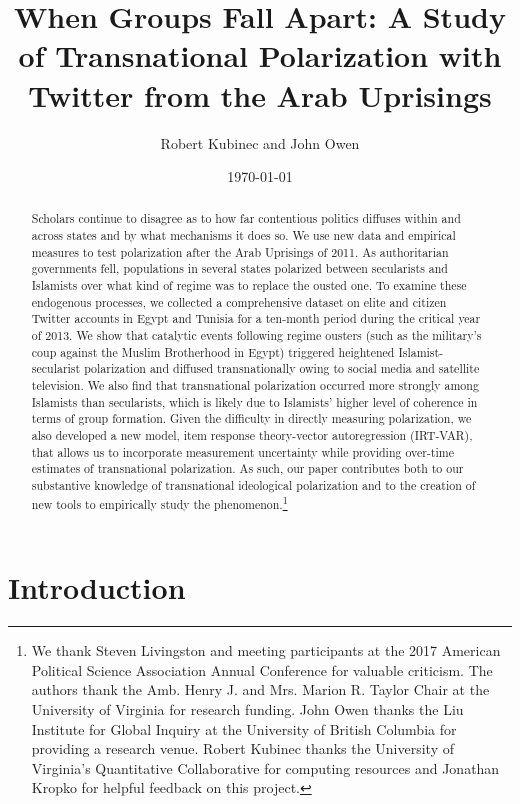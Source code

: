 \documentclass[12pt]{article}
\author{Robert Kubinec and John Owen}
\affil{\small Department of Politics \\
	\small University of Virginia}
\date{\small \today}
\title{When Groups Fall Apart: A Study of Transnational Polarization with Twitter from the Arab Uprisings}
\begin{document}
\maketitle

	\begin{abstract}
		Scholars continue to disagree as to how far contentious politics diffuses within and across states and by what mechanisms it does so. We use new data and empirical measures to test polarization after the Arab Uprisings of 2011. As authoritarian governments fell, populations in several states polarized between secularists and Islamists over what kind of regime was to replace the ousted one. To examine these endogenous processes, we collected a comprehensive dataset on elite and citizen Twitter accounts in Egypt and Tunisia for a ten-month period during the critical year of 2013. We show that catalytic events following regime ousters (such as the military's coup against the Muslim Brotherhood in Egypt) triggered heightened Islamist-secularist polarization and diffused transnationally owing to social media and satellite television. We also find that transnational polarization occurred more strongly among Islamists than secularists, which is likely due to Islamists' higher level of coherence in terms of group formation.  Given the difficulty in directly measuring polarization, we also developed a new model, item response theory-vector autoregression (IRT-VAR), that allows us to incorporate measurement uncertainty while providing over-time estimates of transnational polarization. As such, our paper contributes both to our substantive knowledge of transnational ideological polarization and to the creation of new tools to empirically study the phenomenon.\footnote{\linespread{.5} We thank Steven Livingston and meeting participants at the 2017 American Political Science Association Annual Conference for valuable criticism. The authors thank the Amb. Henry J. and Mrs. Marion R. Taylor Chair at the University of Virginia for research funding.  John Owen thanks the Liu Institute for Global Inquiry at the University of British Columbia for providing a research venue. Robert Kubinec thanks the University of Virginia's Quantitative Collaborative for computing resources and Jonathan Kropko for helpful feedback on this project.}
	\end{abstract}

	\section*{Introduction}
\end{document}
